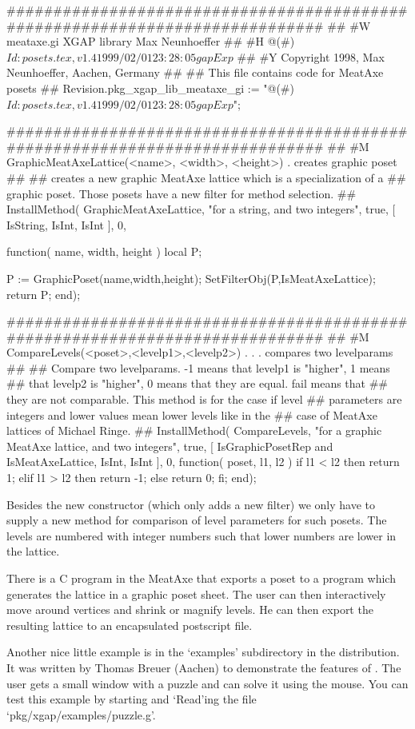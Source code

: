 \beginexample
#############################################################################
##
#W  meataxe.gi                  XGAP library                  Max Neunhoeffer
##
#H  @(#)$Id: posets.tex,v 1.4 1999/02/01 23:28:05 gap Exp $
##
#Y  Copyright 1998,       Max Neunhoeffer,              Aachen,       Germany
##
##  This file contains code for MeatAxe posets
##
Revision.pkg_xgap_lib_meataxe_gi :=
    "@(#)$Id: posets.tex,v 1.4 1999/02/01 23:28:05 gap Exp $";

#############################################################################
##
#M  GraphicMeatAxeLattice(<name>, <width>, <height>)  . creates graphic poset
##
##  creates a new graphic MeatAxe lattice which is a specialization of a
##  graphic poset. Those posets have a new filter for method selection.
##
InstallMethod( GraphicMeatAxeLattice,
    "for a string, and two integers",
    true,
    [ IsString,
      IsInt,
      IsInt ],
    0,

function( name, width, height )
  local P;

  P := GraphicPoset(name,width,height);
  SetFilterObj(P,IsMeatAxeLattice);
  return P;
end);

#############################################################################
##
#M  CompareLevels(<poset>,<levelp1>,<levelp2>) . . . compares two levelparams
##
##  Compare two levelparams. -1 means that levelp1 is "higher", 1 means
##  that levelp2 is "higher", 0 means that they are equal. fail means that
##  they are not comparable. This method is for the case if level
##  parameters are integers and lower values mean lower levels like in the
##  case of MeatAxe lattices of Michael Ringe.
##
InstallMethod( CompareLevels,
    "for a graphic MeatAxe lattice, and two integers",
    true,
    [ IsGraphicPosetRep and IsMeatAxeLattice, IsInt, IsInt ],
    0,
function( poset, l1, l2 )
  if l1 < l2 then
    return 1;
  elif l1 > l2 then
    return -1;
  else
    return 0;
  fi;
end);
\endexample

Besides the new constructor (which only adds a new filter) we only have to
supply a new method for comparison of level parameters for such posets. The 
levels are numbered with integer numbers such that lower numbers are lower
in the lattice.

There is a C program in the MeatAxe that exports a poset to a {\GAP}
program which generates the lattice in a graphic poset sheet. The user can
then interactively move around vertices and shrink or magnify levels. He
can then export the resulting lattice to an encapsulated postscript file.

Another nice little example is in the `examples' subdirectory in the
{\XGAP} distribution. It was written by Thomas Breuer (Aachen) to
demonstrate the features of {\XGAP}. The user gets a small window with a
puzzle and can solve it using the mouse. You can test this example by
starting {\XGAP} and `Read'ing the file `pkg/xgap/examples/puzzle.g'.

